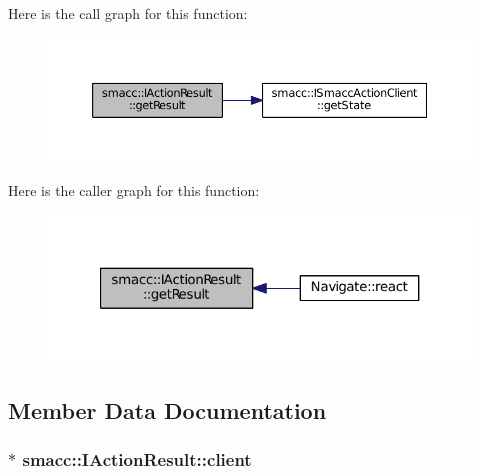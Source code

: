 Here is the call graph for this function\+:
\nopagebreak
\begin{figure}[H]
\begin{center}
\leavevmode
\includegraphics[width=350pt]{structsmacc_1_1IActionResult_a0c127144bfd0a844380533a95f133300_cgraph}
\end{center}
\end{figure}




Here is the caller graph for this function\+:
\nopagebreak
\begin{figure}[H]
\begin{center}
\leavevmode
\includegraphics[width=321pt]{structsmacc_1_1IActionResult_a0c127144bfd0a844380533a95f133300_icgraph}
\end{center}
\end{figure}




\subsection{Member Data Documentation}
\subsubsection[{\texorpdfstring{client}{client}}]{$\ast$ smacc\+::\+I\+Action\+Result\+::client}\hypertarget{structsmacc_1_1IActionResult_a8768f186e223b75188025f318d156ee2}{}\label{structsmacc_1_1IActionResult_a8768f186e223b75188025f318d156ee2}



